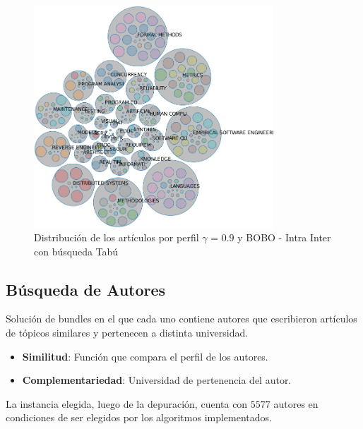 \begin{figure}[H]
  \centering
    \includegraphics[width=0.8\textwidth]{resultados/papers/BOBO/INTRA_INTER/bubbles-gamma-with-local-09.png}
  \caption{Distribución de los artículos por perfil $\gamma$ = $0.9$ y BOBO - Intra Inter con búsqueda Tabú}
  \label{res:img-papers-bubbles-gamma09-hac-intra-inter-bobo}
\end{figure}
\newpage
\subsection{Búsqueda de Autores}
Solución de bundles en el que cada uno contiene autores que escribieron artículos de tópicos similares y pertenecen a distinta universidad.\\

\begin{itemize}
  \item \textbf{Similitud}: Función que compara el perfil de los autores.
  \item \textbf{Complementariedad}: Universidad de pertenencia del autor.
\end{itemize}

La instancia elegida, luego de la depuración, cuenta con $5577$ autores en condiciones de ser elegidos por los algoritmos implementados.\\

